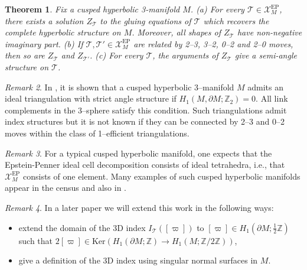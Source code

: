 \documentclass[12pt]{amsart}
\newtheorem{thm}{Theorem}[section]
\theoremstyle{definition}
\theoremstyle{remark}
\newtheorem{rmk}[thm]{Remark}
\def\Z{\mathbb{Z}}
\def\BZ{\mathbb Z}
\def\calX{\mathcal X}
\def\lbl{\label}
\newcommand{\CT}{\mathcal{T}}
\def\EP{\mathrm{EP}}
\def\bd{\partial}
\begin{document}
\begin{thm}
\lbl{thm.3}
Fix a cusped hyperbolic 3-manifold $M$. 
\newline
\rm{(a)} For every $\CT \in \calX_M^{\EP}$, there exists a solution $Z_{\CT}$
to the gluing equations of $\CT$ which recovers the complete hyperbolic 
structure on $M$. Moreover, all shapes of $Z_{\CT}$ have non-negative 
imaginary part.
\newline
\rm{(b)} If $\CT, \CT' \in \calX_M^{\EP}$ are related by 2--3, 3--2, 0--2 and 
2--0 moves, then so are $Z_{\CT}$ and $Z_{\CT'}$.
\newline
\rm{(c)} For every $\CT$, the arguments of $Z_{\CT}$ give a semi-angle structure
on $\CT$.  
\end{thm}

\begin{rmk}
\lbl{rmk.5}
In \cite{HRS}, it is shown that a cusped hyperbolic 3--manifold $M$ admits an ideal triangulation with strict angle structure if $H_1(M, \partial M;\BZ_2)=0$. All link complements in the 3--sphere satisfy this condition. Such triangulations admit index structures but it is not known if they can be connected by 2--3 
and 0--2 moves within the class of 1--efficient triangulations. 
\end{rmk}

\begin{rmk}
\lbl{rmk.XEPM}
For a typical cusped hyperbolic manifold, one expects that the Epstein-Penner
ideal cell decomposition consists of ideal tetrahedra, i.e., that 
$\calX_M^{\EP}$ consists of one element. Many examples of such
cusped hyperbolic manifolds appear in the census \cite{SnapPy} and also
in \cite{Akiyoshi,GS}.
\end{rmk}


\begin{rmk}  
In a later paper we will extend this work in the following ways:
\begin{itemize}
\item  extend the domain of the 3D index $I_\CT([\varpi])$
to $[\varpi]\in H_1(\bd M; \frac{1}{2}\Z)$ such that
$2[\varpi] \in\mathrm{Ker}(H_1(\bd M; \Z) \to H_1(M; \Z/2\Z))$,
\item give a definition of the 3D index using singular normal surfaces in $M$.
\end{itemize}
\end{rmk}
\end{document}
